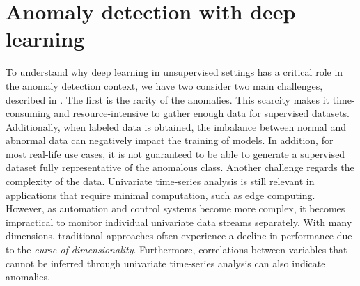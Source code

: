 \section{Anomaly detection with deep learning}
\label{s:ad-with-dl}
To understand why deep learning in unsupervised settings has a critical role in the anomaly detection context, we have two consider two main challenges, described in \cite{choi2021deep}. The first is the rarity of the anomalies. This scarcity makes it time-consuming and resource-intensive to gather enough data for supervised datasets. Additionally, when labeled data is obtained, the imbalance between normal and abnormal data can negatively impact the training of models. In addition, for most real-life use cases, it is not guaranteed to be able to generate a supervised dataset fully representative of the anomalous class. Another challenge regards the complexity of the data. Univariate time-series analysis is still relevant in applications that require minimal computation, such as edge computing. However, as automation and control systems become more complex, it becomes impractical to monitor individual univariate data streams separately. With many dimensions, traditional approaches often experience a decline in performance due to the \textit{curse of dimensionality}. Furthermore, correlations between variables that cannot be inferred through univariate time-series analysis can also indicate anomalies. 



